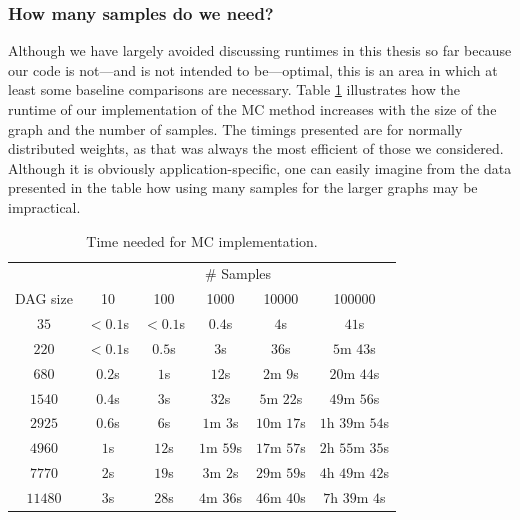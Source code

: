 \documentclass[12pt]{article}
\begin{document}
\subsubsection{How many samples do we need?}
\label{subsubsect.samples}

Although we have largely avoided discussing runtimes in this thesis so far because our code is not---and is not intended to be---optimal, this is an area in which at least some baseline comparisons are necessary. Table \ref{tb.mc_timings} illustrates how the runtime of our implementation of the MC method increases with the size of the graph and the number of samples. The timings presented are for normally distributed weights, as that was always the most efficient of those we considered. Although it is obviously application-specific, one can easily imagine from the data presented in the table how using many samples for the larger graphs may be impractical. 

\begin{table}
	\caption{Time needed for MC implementation.} 
	\begin{center}	
		\begin{tabular}{c c c c c c}
                  \toprule
                  & \multicolumn{5}{c}{\# Samples}     \\
                  \cmidrule{2-6}
                  DAG size & 10 & 100 & 1000 & 10000 & 100000\\
                  \cmidrule{1-6}
                  $35$ & $<0.1$s & $<0.1$s & $0.4$s & $4$s & $41$s\\
                  $220$  & $<0.1$s & $0.5$s & $3$s & $36$s & $5$m $43$s\\
                  $680$ & $0.2$s & $1$s & $12$s & $2$m $9$s & $20$m $44$s\\
                  $1540$ & $0.4$s & $3$s & $32$s & $5$m $22$s & $49$m $56$s\\
                  $2925$ & $0.6$s & $6$s & $1$m $3$s & $10$m $17$s & $1$h $39$m $54$s\\
                  $4960$ & $1$s & $12$s & $1$m $59$s & $17$m $57$s & $2$h $55$m $35$s\\
                  $7770$ & $2$s & $19$s & $3$m $2$s & $29$m $59$s & $4$h $49$m $42$s\\
                  $11480$ & $3$s & $28$s & $4$m $36$s & $46$m $40$s & $7$h $39$m $4$s\\
		\bottomrule
		\end{tabular}
		\label{tb.mc_timings}
	\end{center}	
      \end{table}
\end{document}
